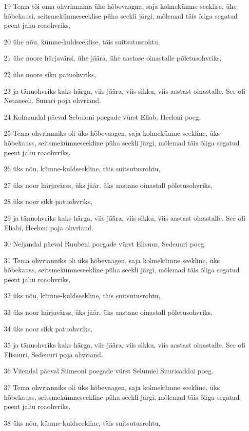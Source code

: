 \par 19 Tema tõi oma ohvriannina ühe hõbevaagna, saja kolmekümne seeklise, ühe hõbekausi, seitsmekümneseeklise püha seekli järgi, mõlemad täis õliga segatud peent jahu roaohvriks,
\par 20 ühe nõu, kümne-kuldseeklise, täis suitsutusrohtu,
\par 21 ühe noore härjavärsi, ühe jäära, ühe aastase oinastalle põletusohvriks,
\par 22 ühe noore siku patuohvriks,
\par 23 ja tänuohvriks kaks härga, viis jäära, viis sikku, viis aastast oinastalle. See oli Netaneeli, Suuari poja ohvriand.
\par 24 Kolmandal päeval Sebuloni poegade vürst Eliab, Heeloni poeg.
\par 25 Tema ohvrianniks oli üks hõbevaagen, saja kolmekümne seekline, üks hõbekauss, seitsmekümneseekline püha seekli järgi, mõlemad täis õliga segatud peent jahu roaohvriks,
\par 26 üks nõu, kümne-kuldseekline, täis suitsutusrohtu,
\par 27 üks noor härjavärss, üks jäär, üks aastane oinastall põletusohvriks,
\par 28 üks noor sikk patuohvriks,
\par 29 ja tänuohvriks kaks härga, viis jäära, viis sikku, viis aastast oinastalle. See oli Eliabi, Heeloni poja ohvriand.
\par 30 Neljandal päeval Ruubeni poegade vürst Elisuur, Sedeuuri poeg.
\par 31 Tema ohvrianniks oli üks hõbevaagen, saja kolmekümne seekline, üks hõbekauss, seitsmekümneseekline püha seekli järgi, mõlemad täis õliga segatud peent jahu roaohvriks,
\par 32 üks nõu, kümne-kuldseekline, täis suitsutusrohtu,
\par 33 üks noor härjavärss, üks jäär, üks aastane oinastall põletusohvriks,
\par 34 üks noor sikk patuohvriks,
\par 35 ja tänuohvriks kaks härga, viis jäära, viis sikku, viis aastast oinastalle. See oli Elisuuri, Sedeuuri poja ohvriand.
\par 36 Viiendal päeval Siimeoni poegade vürst Selumiel Suurisaddai poeg.
\par 37 Tema ohvrianniks oli üks hõbevaagen, saja kolmekümne seekline, üks hõbekauss, seitsmekümneseekline püha seekli järgi, mõlemad täis õliga segatud peent jahu roaohvriks,
\par 38 üks nõu, kümne-kuldseekline, täis suitsutusrohtu,
